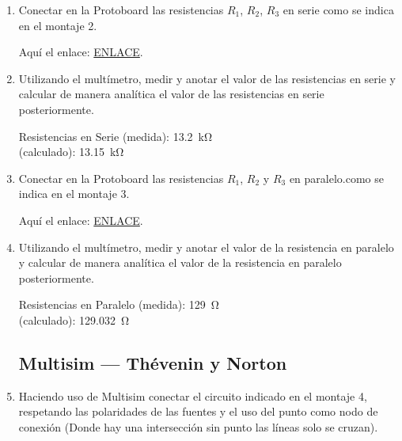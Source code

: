 \documentclass{article}
\begin{document}
\begin{enumerate}
        \item Conectar en la Protoboard las resistencias $R_1$, $R_2$, $R_3$ en serie como se indica en el montaje 2.
    

        Aquí el enlace: \href{https://www.tinkercad.com/things/5Gkyvkg7GTq-practica42?sharecode=7xpEv2MLhaQ7olfOGs4_5N-SzfJAf3cd6AgHGgxkaG0}{ENLACE}.

        \item Utilizando el multímetro, medir y anotar el valor de las resistencias en serie y calcular de manera analítica el valor de las resistencias en serie posteriormente.
        
        Resistencias en Serie (medida): \SI{13.2}{\kilo\ohm}\\
        (calculado): \SI{13.15}{\kilo\ohm}

        \item Conectar en la Protoboard las resistencias $R_1$, $R_2$ y $R_3$ en paralelo.como se indica en el montaje 3.
        

        Aquí el enlace: \href{https://www.tinkercad.com/things/hbra4j5y2LK-practica43?sharecode=wAP4cVVpaAJvN-eEfLwczJ2s_iEZLyozqS59bgLS_6s}{ENLACE}.

        \item Utilizando el multímetro, medir y anotar el valor de la resistencia en paralelo y calcular de manera analítica el valor de la resistencia en paralelo posteriormente. 
        
        Resistencias en Paralelo (medida): \SI{129}{\ohm}\\
        (calculado): \SI{129.032}{\ohm}

        \subsection{Multisim --- Thévenin y Norton}

        \item Haciendo uso de Multisim conectar el circuito indicado en el montaje 4, respetando las polaridades de las fuentes y el uso del punto como nodo de conexión (Donde hay una intersección sin punto las líneas solo se cruzan).


\end{enumerate}
\end{document}
